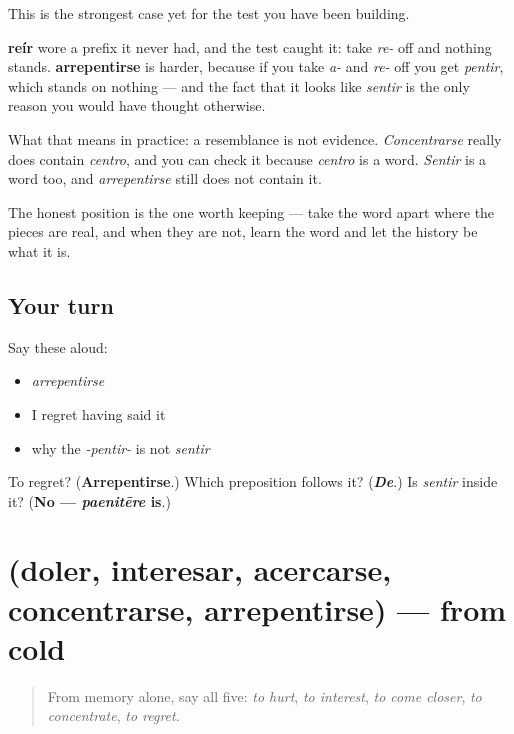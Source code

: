 \begin{culture}
This is the strongest case yet for the test you have been building.

\textbf{reír} wore a prefix it never had, and the test caught it: take \emph{re-} off and nothing stands. \textbf{arrepentirse} is harder, because if you take \emph{a-} and \emph{re-} off you get \emph{pentir}, which stands on nothing — and the fact that it looks like \emph{sentir} is the only reason you would have thought otherwise.

What that means in practice: a resemblance is not evidence. \emph{Concentrarse} really does contain \emph{centro}, and you can check it because \emph{centro} is a word. \emph{Sentir} is a word too, and \emph{arrepentirse} still does not contain it.

The honest position is the one worth keeping — take the word apart where the pieces are real, and when they are not, learn the word and let the history be what it is.
\end{culture}

\subsection*{Your turn}
Say these aloud:

\begin{itemize}
\raggedright
  \item \emph{arrepentirse}
  \item I regret having said it
  \item why the \emph{-pentir-} is not \emph{sentir}
\end{itemize}

\begin{tcolorbox}[breakable,colback=teal!4,colframe=teal!35!black,title={Before you move on}]
To regret? (\textbf{Arrepentirse}.) Which preposition follows it? (\emph{\textbf{De}}.) Is \emph{sentir} inside it? (\textbf{No — \emph{paenitēre} is}.)
\end{tcolorbox}
\section[(doler, interesar, acercarse …]{(doler, interesar, acercarse, concentrarse, arrepentirse) — from cold}

\label{lesson:ES-R443-repaso-animo}



\begin{quote}
From memory alone, say all five: \emph{to hurt}, \emph{to interest}, \emph{to come closer}, \emph{to concentrate}, \emph{to regret}.
\end{quote}

